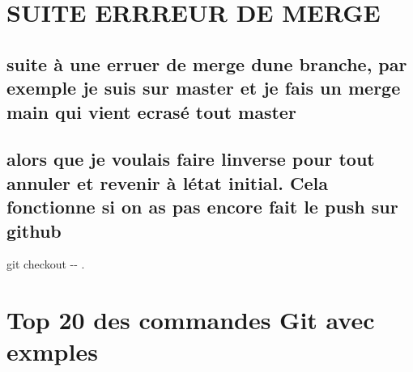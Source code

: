 \section*{S\+U\+I\+TE E\+R\+R\+R\+E\+UR DE M\+E\+R\+GE}

\subsection*{suite à une erruer de merge d\textquotesingle{}une branche, par exemple je suis sur master et je fais un merge main qui vient ecrasé tout master}

\subsection*{alors que je voulais faire l\textquotesingle{}inverse pour tout annuler et revenir à l\textquotesingle{}état initial. Cela fonctionne si on as pas encore fait le push sur github}

{\ttfamily git checkout -\/-\/ .}

\section*{Top 20 des commandes Git avec exmples}


